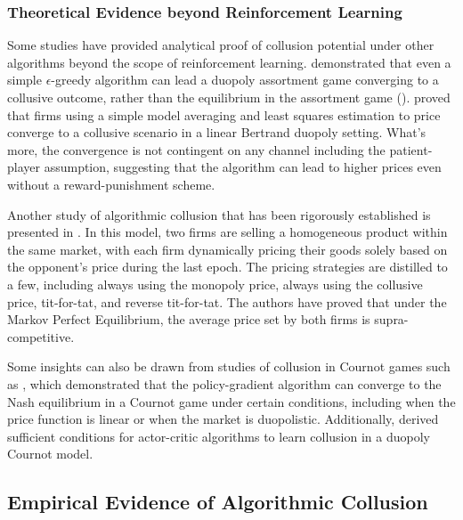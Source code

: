 \documentclass[mnsc,nonblindrev]{workingpaper}
\begin{document}
\subsubsection{Theoretical Evidence beyond Reinforcement Learning}
\label{subsubsec:beyond}\textbf{}

Some studies have provided analytical proof of collusion potential under other algorithms beyond the scope of reinforcement learning. \cite{aouad2021algorithmic} demonstrated that even a simple $\epsilon$-greedy algorithm can lead a duopoly assortment game converging to a collusive outcome, rather than the equilibrium in the assortment game (\cite{besbes2016product}). \cite{cho2024collusive} proved that firms using a simple model averaging and least squares estimation to price converge to a collusive scenario in a linear Bertrand duopoly setting. What's more, the convergence is not contingent on any channel including the patient-player assumption, suggesting that the algorithm can lead to higher prices even without a reward-punishment scheme.

Another study of algorithmic collusion that has been rigorously established is presented in \cite{lamba2022pricing}. In this model, two firms are selling a homogeneous product within the same market, with each firm dynamically pricing their goods solely based on the opponent's price during the last epoch. The pricing strategies are distilled to a few, including always using the monopoly price, always using the collusive price, tit-for-tat, and reverse tit-for-tat. The authors have proved that under the Markov Perfect Equilibrium, the average price set by both firms is supra-competitive.

Some insights can also be drawn from studies of collusion in Cournot games such as \cite{shi2020multi}, which demonstrated that the policy-gradient algorithm can converge to the Nash equilibrium in a Cournot game under certain conditions, including when the price function is linear or when the market is duopolistic. Additionally, \cite{possnig2023reinforcement} derived sufficient conditions for actor-critic algorithms to learn collusion in a duopoly Cournot model.

\subsection{Empirical Evidence of Algorithmic Collusion}
\label{subsec:empirical}
\end{document}
